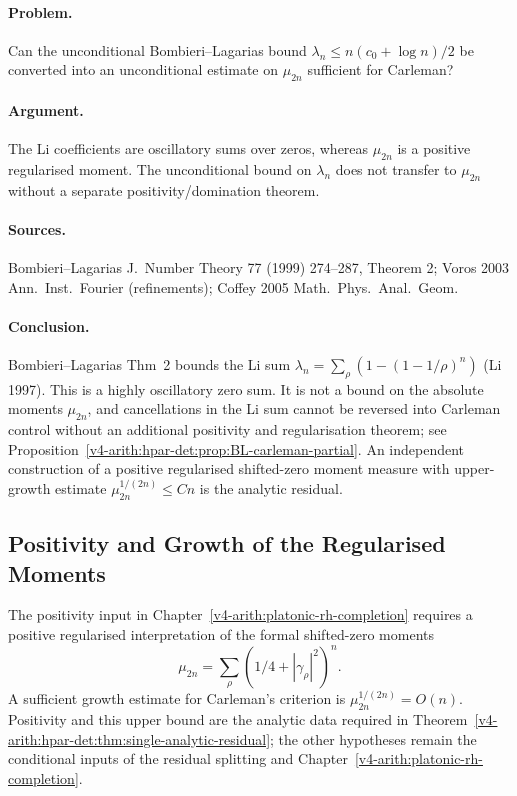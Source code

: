 \paragraph{Problem.} Can the unconditional Bombieri--Lagarias bound
\(\lambda_{n}\leq n(c_{0}+\log n)/2\) be converted into an
unconditional estimate on \(\mu_{2n}\) sufficient for Carleman?

\paragraph{Argument.} The Li coefficients are oscillatory sums over
zeros, whereas \(\mu_{2n}\) is a positive regularised moment. The
unconditional bound on \(\lambda_{n}\) does not
transfer to \(\mu_{2n}\) without a separate positivity/domination
theorem.

\paragraph{Sources.} Bombieri--Lagarias J.~Number Theory 77
(1999) 274--287, Theorem 2; Voros 2003 Ann.~Inst.~Fourier (refinements);
Coffey 2005 Math.~Phys.~Anal.~Geom.

\paragraph{Conclusion.} Bombieri--Lagarias Thm~2 bounds the
Li sum
\(\lambda_{n}=\sum_{\rho}(1-(1-1/\rho)^{n})\) (Li 1997). This is a
highly oscillatory zero sum. It is not a bound on the absolute moments
\(\mu_{2n}\), and cancellations in the Li sum cannot be reversed into
Carleman control without an additional positivity and regularisation
theorem; see
Proposition~\ref{v4-arith:hpar-det:prop:BL-carleman-partial}. An independent
construction of a positive regularised shifted-zero moment measure with
upper-growth estimate \(\mu_{2n}^{1/(2n)}\le Cn\) is the analytic
residual.

\subsection{Positivity and Growth of the Regularised Moments}
\label{v4-arith:hpar-det:cycle-6}

The positivity input in
Chapter~\ref{v4-arith:platonic-rh-completion} requires a positive regularised
interpretation of the formal shifted-zero moments
\[
 \mu_{2n}=\sum_{\rho}(1/4+|\gamma_{\rho}|^{2})^{n}.
\]
A sufficient growth estimate for Carleman's criterion is
\(\mu_{2n}^{1/(2n)}=O(n)\). Positivity and this upper bound are the
analytic data required in
Theorem~\ref{v4-arith:hpar-det:thm:single-analytic-residual}; the other
hypotheses remain the conditional inputs of the residual splitting
and Chapter~\ref{v4-arith:platonic-rh-completion}.

